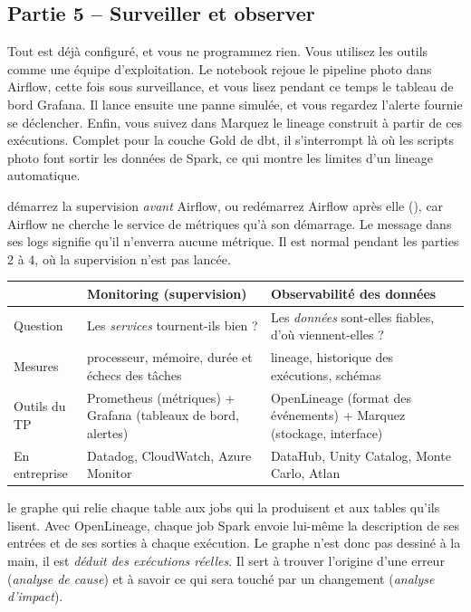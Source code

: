 \subsection*{Partie 5 -- Surveiller et observer \hfill {}}

Tout est déjà configuré, et vous ne programmez rien. Vous utilisez les outils comme une équipe
d'exploitation. Le notebook rejoue le pipeline photo dans Airflow, cette fois sous surveillance, et
vous lisez pendant ce temps le tableau de bord Grafana. Il lance ensuite une panne simulée, et vous
regardez l'alerte fournie se déclencher. Enfin, vous suivez dans Marquez le lineage construit à partir
de ces exécutions. Complet pour la couche Gold de dbt, il s'interrompt là où les scripts photo font sortir les données de
Spark, ce qui montre les limites d'un lineage automatique.

\begin{attention}
démarrez la supervision \emph{avant} Airflow, ou redémarrez Airflow après elle
(), car Airflow ne cherche le service de
métriques qu'à son démarrage. Le message  dans ses logs signifie
qu'il n'enverra aucune métrique. Il est normal pendant les parties 2 à 4, où la supervision n'est pas
lancée.
\end{attention}

\begin{center}
\small
\renewcommand{\arraystretch}{1.25}
\begin{tabularx}{\textwidth}{@{}l X X@{}}
\toprule
& \textbf{Monitoring (supervision)} & \textbf{Observabilité des données} \\
\midrule
Question & Les \emph{services} tournent-ils bien ? & Les \emph{données} sont-elles fiables, d'où viennent-elles ? \\
Mesures & processeur, mémoire, durée et échecs des tâches & lineage, historique des exécutions, schémas \\
Outils du TP & Prometheus (métriques) + Grafana (tableaux de bord, alertes) & OpenLineage (format des événements) + Marquez (stockage, interface) \\
En entreprise & Datadog, CloudWatch, Azure Monitor & DataHub, Unity Catalog, Monte Carlo, Atlan \\
\bottomrule
\end{tabularx}
\end{center}

\begin{notion}[Le lineage]
le graphe qui relie chaque table aux jobs qui la produisent et aux tables
qu'ils lisent. Avec OpenLineage, chaque job Spark envoie lui-même la description de ses entrées et de
ses sorties à chaque exécution. Le graphe n'est donc pas dessiné à la main, il est \emph{déduit des
exécutions réelles}. Il sert à trouver l'origine d'une erreur (\emph{analyse de cause}) et à savoir
ce qui sera touché par un changement (\emph{analyse d'impact}).
\end{notion}


